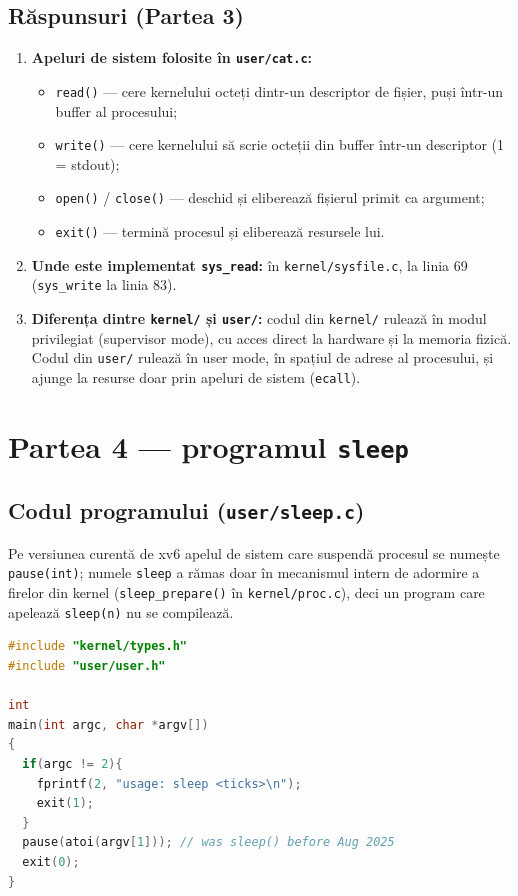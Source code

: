 \documentclass[12pt,a4paper]{article}
\begin{document}
\subsection{Răspunsuri (Partea 3)}
\begin{enumerate}
    \item \textbf{Apeluri de sistem folosite în \texttt{user/cat.c}:}
    \begin{itemize}
        \item \texttt{read()} --- cere kernelului octeți dintr-un descriptor de fișier, puși într-un buffer al procesului;
        \item \texttt{write()} --- cere kernelului să scrie octeții din buffer într-un descriptor (1 = stdout);
        \item \texttt{open()} / \texttt{close()} --- deschid și eliberează fișierul primit ca argument;
        \item \texttt{exit()} --- termină procesul și eliberează resursele lui.
    \end{itemize}
    \item \textbf{Unde este implementat \texttt{sys\_read}:} în \texttt{kernel/sysfile.c}, la linia 69 (\texttt{sys\_write} la linia 83).
    \item \textbf{Diferența dintre \texttt{kernel/} și \texttt{user/}:} codul din \texttt{kernel/} rulează în modul privilegiat (supervisor mode), cu acces direct la hardware și la memoria fizică. Codul din \texttt{user/} rulează în user mode, în spațiul de adrese al procesului, și ajunge la resurse doar prin apeluri de sistem (\texttt{ecall}).
\end{enumerate}

\section{Partea 4 --- programul \texttt{sleep}}
\subsection{Codul programului (\texttt{user/sleep.c})}
{\sloppy Pe versiunea curentă de xv6 apelul de sistem care suspendă procesul se numește \texttt{pause(int)}; numele \texttt{sleep} a rămas doar în mecanismul intern de adormire a firelor din kernel (\texttt{sleep\_prepare()} în \texttt{kernel/proc.c}), deci un program care apelează \texttt{sleep(n)} nu se compilează.\par}
\begin{lstlisting}[language=C]
#include "kernel/types.h"
#include "user/user.h"

int
main(int argc, char *argv[])
{
  if(argc != 2){
    fprintf(2, "usage: sleep <ticks>\n");
    exit(1);
  }
  pause(atoi(argv[1])); // was sleep() before Aug 2025
  exit(0);
}
\end{lstlisting}
\end{document}
